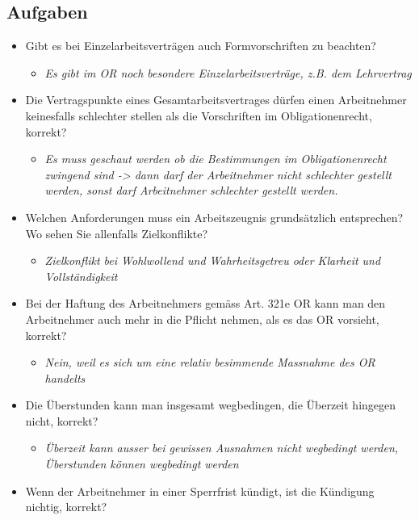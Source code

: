 \newpage

\subsection{Aufgaben}

\begin{itemize}
    \item Gibt es bei Einzelarbeitsverträgen auch Formvorschriften zu beachten?
    \begin{itemize}
        \item \textit{Es gibt im OR noch besondere Einzelarbeitsverträge, z.B. dem Lehrvertrag}
    \end{itemize}
    \item Die Vertragspunkte eines Gesamtarbeitsvertrages dürfen einen Arbeitnehmer keinesfalls schlechter stellen als die Vorschriften im Obligationenrecht, korrekt?
    \begin{itemize}
        \item \textit{Es muss geschaut werden ob die Bestimmungen im Obligationenrecht zwingend sind -> dann darf der Arbeitnehmer nicht schlechter gestellt werden, sonst darf Arbeitnehmer schlechter gestellt werden.}
    \end{itemize}
    \item Welchen Anforderungen muss ein Arbeitszeugnis grundsätzlich entsprechen? Wo sehen Sie allenfalls Zielkonflikte?
    \begin{itemize}
        \item \textit{Zielkonflikt bei Wohlwollend und Wahrheitsgetreu oder Klarheit und Vollständigkeit}
    \end{itemize}
    \item Bei der Haftung des Arbeitnehmers gemäss Art. 321e OR kann man den Arbeitnehmer auch mehr in die Pflicht nehmen, als es das OR vorsieht, korrekt?
    \begin{itemize}
        \item \textit{Nein, weil es sich um eine relativ besimmende Massnahme des OR handelts}
    \end{itemize}
    \item Die Überstunden kann man insgesamt wegbedingen, die Überzeit hingegen nicht, korrekt?
    \begin{itemize}
        \item \textit{Überzeit kann ausser bei gewissen Ausnahmen nicht wegbedingt werden, Überstunden können wegbedingt werden}
    \end{itemize}
    \item Wenn der Arbeitnehmer in einer Sperrfrist kündigt, ist die Kündigung nichtig, korrekt?

\end{itemize}

